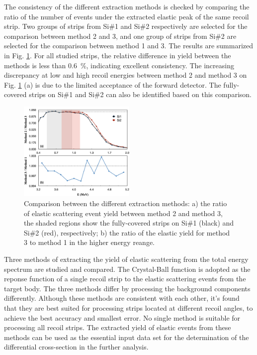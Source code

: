 \documentclass[fleqn,twocolumn,a4paper]{ikpar}
\begin{document}
The consistency of the different extraction methods is checked by comparing the
ratio of the number of events under the extracted elastic peak of the same recoil strip.
Two groups of strips from Si\#1 and Si\#2 respectively are selected for the
comparison between method 2 and 3, and one group of strips from Si\#2 are selected
for the comparison between method 1 and 3.
The results are summarized in Fig. \ref{fig:extraction_consistence}.
For all studied strips, the relative difference in yield between the methods is
less than \SI{0.6}{\percent}, indicating excellent consistency.
The increasing discrepancy at low and high recoil energies between method 2 and
method 3 on Fig. \ref{fig:extraction_consistence} (a) is due to the limited
acceptance of the forward detector.
The fully-covered strips on Si\#1 and Si\#2 can also be identified based on this comparison.
\begin{figure}[!htb]
	\includegraphics[width=0.5\textwidth]{./comparison_methods.png}
  \caption{Comparison between the different extraction
    methods: a) the ratio of elastic scattering event yield between method 2 and
    method 3, the shaded regions show the fully-covered strips on Si\#1
    (black) and Si\#2 (red), respectively; b) the ratio of the elastic yield for
    method 3 to method 1 in the higher energy reange.}
  \label{fig:extraction_consistence}
\end{figure}

\par
\medskip

Three methods of extracting the yield of elastic scattering from the total
energy spectrum are studied and compared.
The Crystal-Ball function is adopted as the reponse function of a single recoil strip to the
elastic scattering events from the target body.
The three methods differ by processing the background components differently.
Although these methods are consistent with each other, it's found that they are best suited for
processing strips located at different recoil angles, to achieve the best accuracy
and smallest error.
No single method is suitable for processing all recoil strips.
The extracted yield of elastic events from these methods can be used as
the essential input data set for the determination of the differential cross-section in the further analysis.
\end{document}
